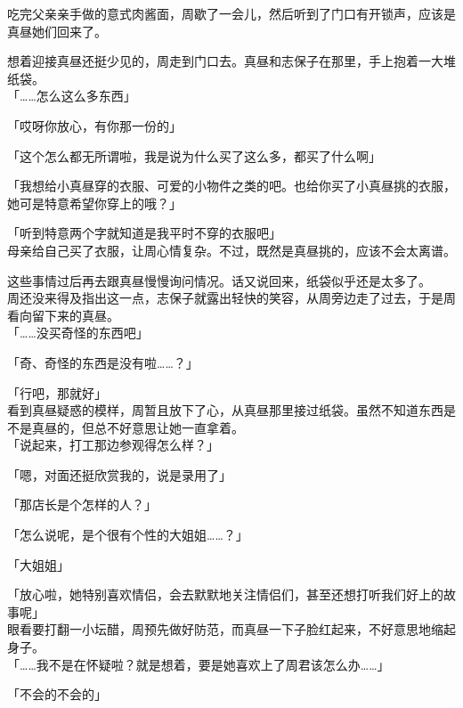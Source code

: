 \vspace{2\baselineskip}

吃完父亲亲手做的意式肉酱面，周歇了一会儿，然后听到了门口有开锁声，应该是真昼她们回来了。

想着迎接真昼还挺少见的，周走到门口去。真昼和志保子在那里，手上抱着一大堆纸袋。\\

「……怎么这么多东西」

「哎呀你放心，有你那一份的」

「这个怎么都无所谓啦，我是说为什么买了这么多，都买了什么啊」

「我想给小真昼穿的衣服、可爱的小物件之类的吧。也给你买了小真昼挑的衣服，她可是特意希望你穿上的哦？」

「听到特意两个字就知道是我平时不穿的衣服吧」\\

母亲给自己买了衣服，让周心情复杂。不过，既然是真昼挑的，应该不会太离谱。

这些事情过后再去跟真昼慢慢询问情况。话又说回来，纸袋似乎还是太多了。\\

周还没来得及指出这一点，志保子就露出轻快的笑容，从周旁边走了过去，于是周看向留下来的真昼。\\

「……没买奇怪的东西吧」

「奇、奇怪的东西是没有啦……？」

「行吧，那就好」\\

看到真昼疑惑的模样，周暂且放下了心，从真昼那里接过纸袋。虽然不知道东西是不是真昼的，但总不好意思让她一直拿着。\\

「说起来，打工那边参观得怎么样？」

「嗯，对面还挺欣赏我的，说是录用了」

「那店长是个怎样的人？」

「怎么说呢，是个很有个性的大姐姐……？」

「大姐姐」

「放心啦，她特别喜欢情侣，会去默默地关注情侣们，甚至还想打听我们好上的故事呢」\\

眼看要打翻一小坛醋，周预先做好防范，而真昼一下子脸红起来，不好意思地缩起身子。\\

「……我不是在怀疑啦？就是想着，要是她喜欢上了周君该怎么办……」

「不会的不会的」

